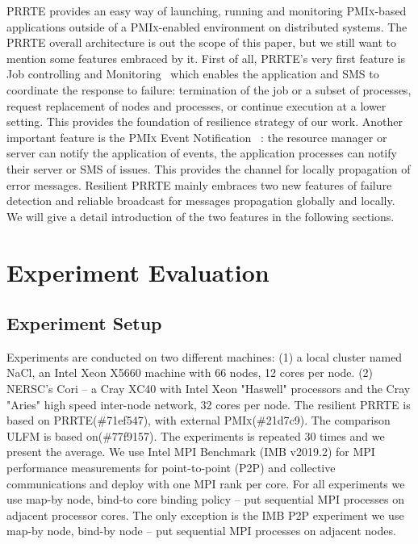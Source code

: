 \documentclass[sigconf]{acmart}
\newcommand{\prrte}[0]{\textsc{PRRTE}\xspace}
\newcommand{\pmix}[0]{\textsc{PMIx}\xspace}
\newcommand{\ulfm}[0]{\textsc{ULFM}\xspace}
\newcommand{\mpi}[0]{\textsc{MPI}\xspace}
\newcommand{\imb}[0]{\textsc{IMB}\xspace}
\begin{document}
\prrte provides an easy way of launching, running and monitoring \pmix-based applications outside of a \pmix-enabled environment on distributed systems. The \prrte overall architecture is out the scope of this paper, but we still want to mention some features embraced by it. First of all, \prrte's very first feature is Job controlling and Monitoring~\cite{Ralph15} which enables the application and SMS to coordinate the response to failure: termination of the job or a subset of processes, request replacement of nodes and processes, or continue execution at a lower setting. This provides the foundation of resilience strategy of our work. Another important feature is the \pmix Event Notification~\cite{Ralph002} : the resource manager or server can notify the application of events, the application processes can notify their server or SMS of issues. This provides the channel for locally propagation of error messages. Resilient \prrte mainly embraces two new features of failure detection and reliable broadcast for messages propagation globally and locally. We will give a detail introduction of the two features in the following sections.

\section{Experiment Evaluation}\label{sec:experiments}

\subsection{Experiment Setup}
Experiments are conducted on two different machines: (1) a local cluster named NaCl, an Intel Xeon X5660 machine with 66 nodes, 12 cores per node. (2) NERSC's Cori
-- a Cray XC40 with Intel Xeon "Haswell" processors and the Cray "Aries" high speed inter-node network, 32 cores per node. The resilient \prrte is based on \prrte(\#71ef547), with external \pmix(\#21d7c9). The comparison \ulfm is based on(\#77f9157). The experiments is repeated 30 times and we present the average. We use Intel MPI Benchmark (\imb v2019.2) \cite{IMB} for MPI performance measurements for point-to-point (P2P) and collective communications and deploy with one \mpi rank per core. For all experiments we use map-by node, bind-to core binding policy -- put sequential MPI processes on adjacent processor cores. The only exception is the \imb P2P experiment we use map-by node, bind-by node -- put sequential MPI processes on adjacent nodes. 
\end{document}
